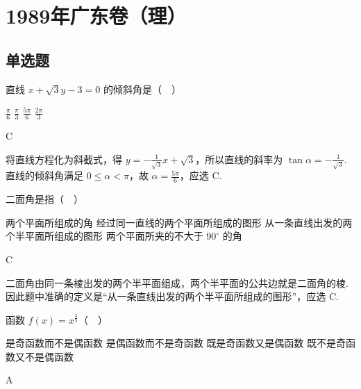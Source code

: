 \chapter{1989年广东卷（理）}

\section{单选题}

\begin{problem}
直线 \(x+\sqrt{3}y-3=0\) 的倾斜角是（\(\quad\)）

\choices
    {\(\frac{\pi}{6}\)}
    {\(\frac{\pi}{3}\)}
    {\(\frac{5\pi}{6}\)}
    {\(\frac{2\pi}{3}\)}
\end{problem}

\begin{answer}
C
\end{answer}

\begin{solution}
将直线方程化为斜截式，得
\(y=-\frac{1}{\sqrt{3}}x+\sqrt{3}\)，所以直线的斜率为 \(\tan\alpha=-\frac{1}{\sqrt{3}}\). 直线的倾斜角满足 \(0\leqslant\alpha<\pi\)，故 \(\alpha=\frac{5\pi}{6}\)，应选 C.
\end{solution}

\begin{problem}
二面角是指（\(\quad\)）

\choices
    {两个平面所组成的角}
    {经过同一直线的两个平面所组成的图形}
    {从一条直线出发的两个半平面所组成的图形}
    {两个平面所夹的不大于 \(90^\circ\) 的角}
\end{problem}

\begin{answer}
C
\end{answer}

\begin{solution}
二面角由同一条棱出发的两个半平面组成，两个半平面的公共边就是二面角的棱. 因此题中准确的定义是“从一条直线出发的两个半平面所组成的图形”，应选 C.
\end{solution}

\begin{problem}
函数 \(f(x)=x^{\frac{3}{5}}\)（\(\quad\)）

\choices
    {是奇函数而不是偶函数}
    {是偶函数而不是奇函数}
    {既是奇函数又是偶函数}
    {既不是奇函数又不是偶函数}
\end{problem}

\begin{answer}
A
\end{answer}

